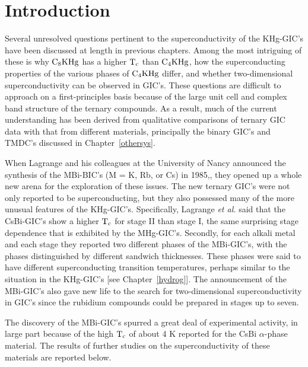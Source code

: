 \section{Introduction}
\label{csbi-intro}
	 Several unresolved questions pertinent to the superconductivity of
the  KHg-GIC's have been discussed at  length in  previous chapters.  Among
the most intriguing  of these is why $\rm  C_8KHg$ has a higher  $\rm  T_c$
than $\rm C_4KHg$, how the superconducting properties of the various phases
of $\rm  C_4KHg$ differ, and  whether two-dimensional superconductivity can
be observed   in GIC's.  These  questions are  difficult to approach   on a
first-principles basis because  of  the large unit  cell and   complex band
structure of the ternary  compounds.  As  a  result,   much of the  current
understanding has been derived from	 qualitative comparisons of ternary
GIC data with that from different  materials, principally the  binary GIC's
and TMDC's discussed in Chapter~\ref{othersys}.

	When Lagrange  and his colleagues    at the  University  of   Nancy
announced   the  synthesis of   the MBi-BIC's  (M   =  K,  Rb,   or  Cs) in
1985,\cite{lagrange85},   they    opened up  a  whole  new  arena   for the
exploration of these issues.  The new ternary GIC's  were not only reported
to be  superconducting, but they also possessed  many of the   more unusual
features of the  KHg-GIC's.  Specifically, Lagrange {\em  et al.} said that
the CsBi-GIC's show a higher $\rm T_c$ for stage II than  stage I, the same
surprising    stage    dependence    that      is     exhibited   by    the
MHg-GIC's.\cite{mcrae86}  Secondly,  for each alkali metal  and  each stage
they  reported two  different  phases  of  the  MBi-GIC's, with  the phases
distinguished  by  different sandwich thicknesses.\cite{lagrange85,mcrae86}
These phases  were   said  to have    different superconducting  transition
temperatures,\cite{mcrae86}  perhaps   similar  to  the  situation   in the
KHg-GIC's  [see Chapter~\ref{hydrog}].   The announcement  of the MBi-GIC's
also gave new life  to the search for  two-dimensional superconductivity in
GIC's since  the rubidium  compounds  could  be prepared  in  stages  up to
seven.\cite{lagrange85}

	The discovery of the MBi-GIC's spurred a great deal of experimental
activity,   in large part  because   of  the   high $\rm  T_c$  of about  4
K\cite{lagrange85} reported  for the  CsBi  $\alpha$-phase  material.   The
results of further studies on the superconductivity  of these materials are
reported below.
